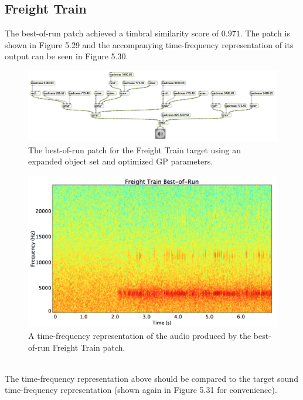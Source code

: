 \documentclass[12pt]{report} 	%
\numberwithin{figure}{chapter}
\numberwithin{table}{chapter}
\numberwithin{equation}{chapter}
\begin{document}
\begin{flushleft}
\clearpage
\subsection{Freight Train}

The best-of-run patch achieved a timbral similarity score of $0.971$. The patch is shown in Figure 5.29 and the accompanying time-frequency representation of its output can be seen in Figure 5.30.

\begin{figure}[h!]
\begin{center}
\includegraphics[angle=270, scale=0.50]{FreightTrain_Best}
\caption[Freight train best-of-run patch]{The best-of-run patch for the Freight Train target using an expanded object set and optimized GP parameters.}
\end{center}
\end{figure}
\begin{figure}[h!]
\begin{center}
\includegraphics[scale=0.35,width=\linewidth]{FreightTrainBestOfRunSTFT}
\caption[Best-of-run freight train time-frequency representation]{A time-frequency representation of the audio produced by the best-of-run Freight Train patch.}
\end{center}
\end{figure}
\\
The time-frequency representation above should be compared to the target sound time-frequency representation (shown again in Figure 5.31 for convenience).

\end{flushleft}
\end{document}
